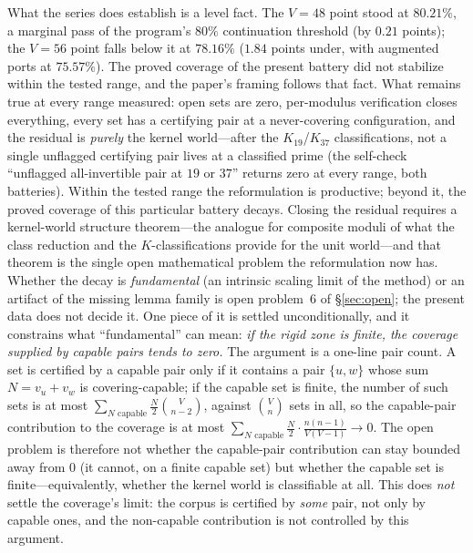 \documentclass[11pt,a4paper]{article}
\numberwithin{equation}{section}
\theoremstyle{plain}
\theoremstyle{plain}
\theoremstyle{definition}
\theoremstyle{remark}
\begin{document}
What the series does establish is a level fact. The $V=48$ point stood
at $80.21\%$, a marginal pass of the program's $80\%$ continuation
threshold (by $0.21$ points); the $V=56$ point falls below it at
$78.16\%$ ($1.84$ points under, with augmented ports at $75.57\%$). The
proved coverage of the present battery did not stabilize within the
tested range, and the paper's framing follows that fact. What remains
true at every range measured: open sets are zero, per-modulus
verification closes everything, every set has a certifying pair at a
never-covering configuration, and the residual is \emph{purely} the
kernel world---after the $K_{19}$/$K_{37}$ classifications, not a single
unflagged certifying pair lives at a classified prime (the self-check
``unflagged all-invertible pair at $19$ or $37$'' returns zero at every
range, both batteries). Within the tested range the reformulation is
productive; beyond it, the proved coverage of this particular battery
decays. Closing the residual requires a kernel-world structure
theorem---the analogue for composite moduli of what the class reduction
and the $K$-classifications provide for the unit world---and that theorem
is the single open mathematical problem the reformulation now has.
Whether the decay is \emph{fundamental} (an intrinsic scaling limit of
the method) or an artifact of the missing lemma family is open
problem~6 of \S\ref{sec:open}; the present
data does not decide it. One piece of it is settled
unconditionally, and it constrains what ``fundamental'' can mean: \emph{if
the rigid zone is finite, the coverage supplied by capable pairs tends
to zero.} The argument is a one-line pair count. A set is certified by
a capable pair only if it contains a pair $\{u,w\}$ whose sum
$N=v_u+v_w$ is covering-capable; if the capable set is finite, the
number of such sets is at most
$\sum_{N\text{ capable}}\tfrac{N}{2}\binom{V}{n-2}$, against
$\binom{V}{n}$ sets in all, so the capable-pair contribution to the
coverage is at most
$\sum_{N\text{ capable}}\tfrac{N}{2}\cdot\tfrac{n(n-1)}{V(V-1)}\to 0$.
The open problem is therefore not whether the capable-pair contribution
can stay bounded away from $0$ (it cannot, on a finite capable set) but
whether the capable set is finite---equivalently, whether the kernel
world is classifiable at all. This does \emph{not} settle the coverage's
limit: the corpus is certified by \emph{some} pair, not only by capable
ones, and the non-capable contribution is not controlled by this
argument.
\end{document}
